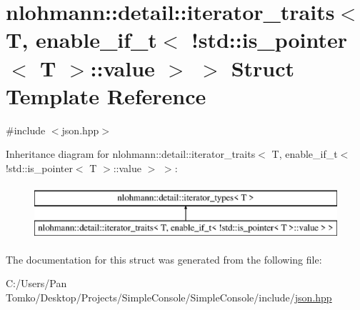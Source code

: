 \hypertarget{structnlohmann_1_1detail_1_1iterator__traits_3_01_t_00_01enable__if__t_3_01_9std_1_1is__pointer_3_01_t_01_4_1_1value_01_4_01_4}{}\section{nlohmann\+::detail\+::iterator\+\_\+traits$<$ T, enable\+\_\+if\+\_\+t$<$ !std\+::is\+\_\+pointer$<$ T $>$\+::value $>$ $>$ Struct Template Reference}
\label{structnlohmann_1_1detail_1_1iterator__traits_3_01_t_00_01enable__if__t_3_01_9std_1_1is__pointer_3_01_t_01_4_1_1value_01_4_01_4}


{\ttfamily \#include $<$json.\+hpp$>$}

Inheritance diagram for nlohmann\+::detail\+::iterator\+\_\+traits$<$ T, enable\+\_\+if\+\_\+t$<$ !std\+::is\+\_\+pointer$<$ T $>$\+::value $>$ $>$\+:\begin{figure}[H]
\begin{center}
\leavevmode
\includegraphics[height=2.000000cm]{dc/df9/structnlohmann_1_1detail_1_1iterator__traits_3_01_t_00_01enable__if__t_3_01_9std_1_1is__pointer_3_01_t_01_4_1_1value_01_4_01_4}
\end{center}
\end{figure}


The documentation for this struct was generated from the following file\+:\begin{DoxyCompactItemize}
\item 
C\+:/\+Users/\+Pan Tomko/\+Desktop/\+Projects/\+Simple\+Console/\+Simple\+Console/include/\mbox{\hyperlink{json_8hpp}{json.\+hpp}}\end{DoxyCompactItemize}
